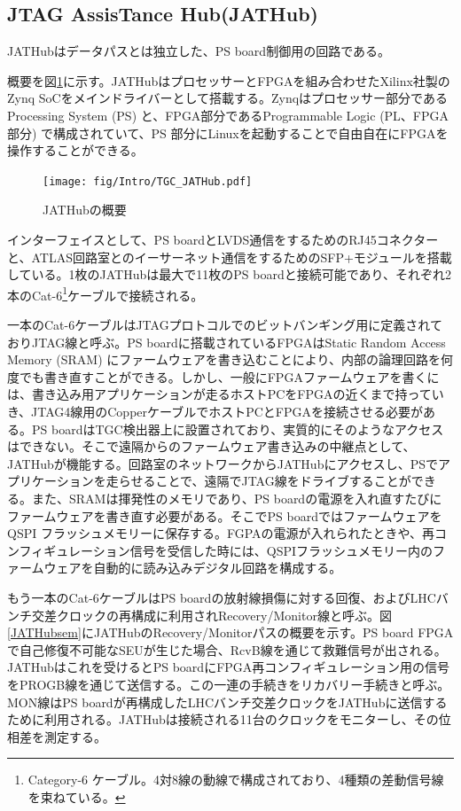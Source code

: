         \subsection*{JTAG AssisTance Hub(JATHub)}
    JATHubはデータパスとは独立した、PS board制御用の回路である。

    概要を図\ref{TGC_JATHub}に示す。JATHubはプロセッサーとFPGAを組み合わせたXilinx社製のZynq SoCをメインドライバーとして搭載する。Zynqはプロセッサー部分であるProcessing System (PS) と、FPGA部分であるProgrammable Logic (PL、FPGA部分) で構成されていて、PS 部分にLinuxを起動することで自由自在にFPGAを操作することができる。

    \begin{figure} 
        \centering
        \texttt{[image: fig/Intro/TGC\_JATHub.pdf]}
        \caption[JATHubの概要]{JATHubの概要}
        \label{TGC_JATHub}
    \end{figure}
    
    インターフェイスとして、PS boardとLVDS通信をするためのRJ45コネクターと、ATLAS回路室とのイーサーネット通信をするためのSFP+モジュールを搭載している。1枚のJATHubは最大で11枚のPS boardと接続可能であり、それぞれ2本のCat-6\footnote{Category-6 ケーブル。4対8線の動線で構成されており、4種類の差動信号線を束ねている。}ケーブルで接続される。

    一本のCat-6ケーブルはJTAGプロトコルでのビットバンギング用に定義されておりJTAG線と呼ぶ。PS boardに搭載されているFPGAはStatic Random Access Memory (SRAM) にファームウェアを書き込むことにより、内部の論理回路を何度でも書き直すことができる。しかし、一般にFPGAファームウェアを書くには、書き込み用アプリケーションが走るホストPCをFPGAの近くまで持っていき、JTAG4線用のCopperケーブルでホストPCとFPGAを接続させる必要がある。PS boardはTGC検出器上に設置されており、実質的にそのようなアクセスはできない。そこで遠隔からのファームウェア書き込みの中継点として、JATHubが機能する。回路室のネットワークからJATHubにアクセスし、PSでアプリケーションを走らせることで、遠隔でJTAG線をドライブすることができる。また、SRAMは揮発性のメモリであり、PS boardの電源を入れ直すたびにファームウェアを書き直す必要がある。そこでPS boardではファームウェアをQSPI フラッシュメモリーに保存する。FGPAの電源が入れられたときや、再コンフィギュレーション信号を受信した時には、QSPIフラッシュメモリー内のファームウェアを自動的に読み込みデジタル回路を構成する。

    もう一本のCat-6ケーブルはPS boardの放射線損傷に対する回復、およびLHCバンチ交差クロックの再構成に利用されRecovery/Monitor線と呼ぶ。図\ref{JATHubsem}にJATHubのRecovery/Monitorパスの概要を示す。PS board FPGAで自己修復不可能なSEUが生じた場合、RcvB線を通じて救難信号が出される。JATHubはこれを受けるとPS boardにFPGA再コンフィギュレーション用の信号をPROGB線を通じて送信する。この一連の手続きをリカバリー手続きと呼ぶ。MON線はPS boardが再構成したLHCバンチ交差クロックをJATHubに送信するために利用される。JATHubは接続される11台のクロックをモニターし、その位相差を測定する。

